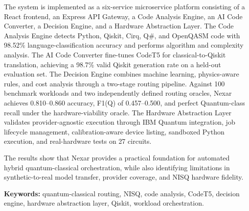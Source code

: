 \documentclass[12pt,a4paper]{report}
\begin{document}
The system is implemented as a six-service microservice platform consisting of a React frontend, an Express API Gateway, a Code Analysis Engine, an AI Code Converter, a Decision Engine, and a Hardware Abstraction Layer. The Code Analysis Engine detects Python, Qiskit, Cirq, Q\#, and OpenQASM code with 98.52\% language-classification accuracy and performs algorithm and complexity analysis. The AI Code Converter fine-tunes CodeT5 for classical-to-Qiskit translation, achieving a 98.7\% valid Qiskit generation rate on a held-out evaluation set. The Decision Engine combines machine learning, physics-aware rules, and cost analysis through a two-stage routing pipeline. Against 100 benchmark workloads and two independently defined routing oracles, Nexar achieves 0.810--0.860 accuracy, F1(Q) of 0.457--0.500, and perfect Quantum-class recall under the hardware-viability oracle. The Hardware Abstraction Layer validates provider-agnostic execution through IBM Quantum integration, job lifecycle management, calibration-aware device listing, sandboxed Python execution, and real-hardware tests on 27 circuits.

The results show that Nexar provides a practical foundation for automated hybrid quantum-classical orchestration, while also identifying limitations in synthetic-to-real model transfer, provider coverage, and NISQ hardware fidelity.

\textbf{Keywords:} quantum-classical routing, NISQ, code analysis, CodeT5, decision engine, hardware abstraction layer, Qiskit, workload orchestration.

\tableofcontents
\listoftables
\listoffigures
\end{document}
